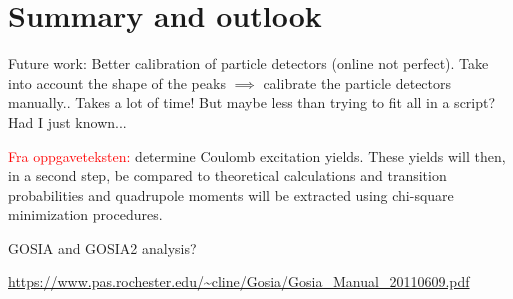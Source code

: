 \documentclass[twoside,english]{uiofysmaster/uiofysmaster}
\begin{document}
\chapter{Summary and outlook}

Future work: Better calibration of particle detectors (online not perfect). Take into account the shape of the peaks $\implies$ calibrate the particle detectors manually.. Takes a lot of time! But maybe less than trying to fit all in a script? Had I just known...


\textcolor{red}{Fra oppgaveteksten:} \newline
determine Coulomb excitation yields. These yields will then, in a second step, be compared to theoretical calculations and transition probabilities and quadrupole moments will be extracted using chi-square minimization procedures.


GOSIA and GOSIA2 analysis?

\url{https://www.pas.rochester.edu/~cline/Gosia/Gosia_Manual_20110609.pdf}





\end{document}
